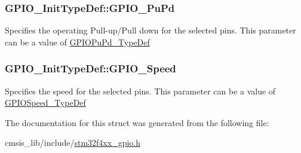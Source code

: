 \subsubsection[{\texorpdfstring{G\+P\+I\+O\+\_\+\+Pu\+Pd}{GPIO_PuPd}}]{ G\+P\+I\+O\+\_\+\+Init\+Type\+Def\+::\+G\+P\+I\+O\+\_\+\+Pu\+Pd}\hypertarget{struct_g_p_i_o___init_type_def_aad62942c003bc2083d37f10f6f39bd5f}{}\label{struct_g_p_i_o___init_type_def_aad62942c003bc2083d37f10f6f39bd5f}
Specifies the operating Pull-\/up/\+Pull down for the selected pins. This parameter can be a value of \hyperlink{group___g_p_i_o_gafb7ecd99c44b4fd702d669304a36c2c8}{G\+P\+I\+O\+Pu\+Pd\+\_\+\+Type\+Def} 
\subsubsection[{\texorpdfstring{G\+P\+I\+O\+\_\+\+Speed}{GPIO_Speed}}]{ G\+P\+I\+O\+\_\+\+Init\+Type\+Def\+::\+G\+P\+I\+O\+\_\+\+Speed}\hypertarget{struct_g_p_i_o___init_type_def_ac05832cacebc861a9acf5294d702c16b}{}\label{struct_g_p_i_o___init_type_def_ac05832cacebc861a9acf5294d702c16b}
Specifies the speed for the selected pins. This parameter can be a value of \hyperlink{group___g_p_i_o_ga062ad92b67b4a1f301c161022cf3ba8e}{G\+P\+I\+O\+Speed\+\_\+\+Type\+Def} 

The documentation for this struct was generated from the following file\+:\begin{DoxyCompactItemize}
\item 
cmsis\+\_\+lib/include/\hyperlink{stm32f4xx__gpio_8h}{stm32f4xx\+\_\+gpio.\+h}\end{DoxyCompactItemize}
